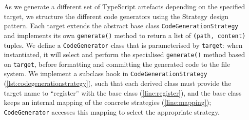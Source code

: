 As we generate a different set of TypeScript artefacts depending
on the specified target, we structure the different code generators
using the Strategy design pattern. Each target extends the
abstract base class \texttt{CodeGenerationStrategy} 
and implements its own \texttt{generate()}
method to return a list of \texttt{(path, content)} tuples. 
We define a \texttt{CodeGenerator} class that is parameterised 
by \texttt{target}: when instantiated, it will select and perform 
the specialised \texttt{generate()} method based on \texttt{target}, 
before formatting and committing the generated code 
to the file system.
We implement a subclass hook in \texttt{CodeGenerationStrategy}
(\cref{lst:codegenerationstrategy}),
such that each derived class must provide the target name to
``register'' with the base class (\cref{line:register}),
and the base class keeps an internal
mapping of the concrete strategies (\cref{line:mapping}); 
\texttt{CodeGenerator} accesses
this mapping to select the appropriate strategy.
